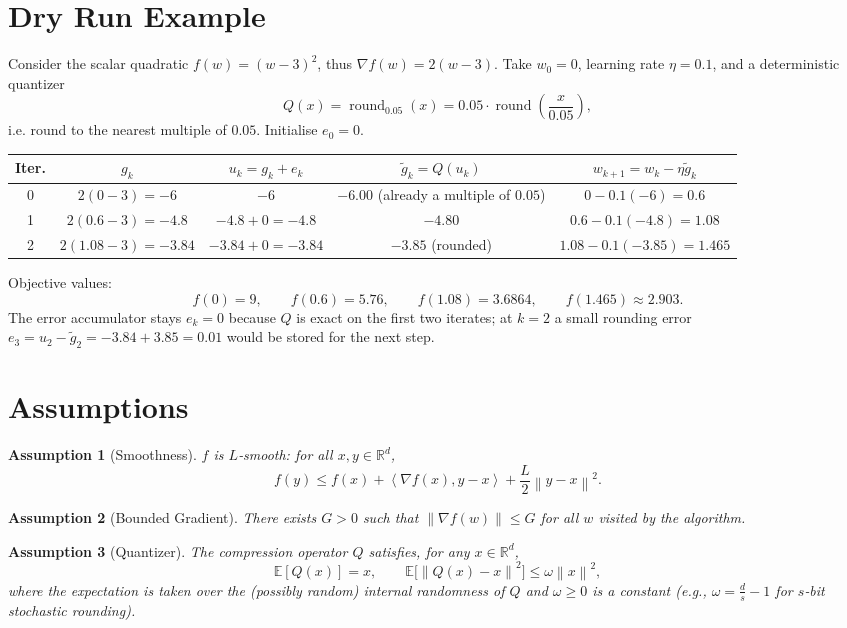 \documentclass{article}
\newtheorem{assumption}{Assumption}
\newcommand{\E}{\mathbb{E}}
\newcommand{\norm}[1]{\left\lVert #1\right\rVert}
\newcommand{\ip}[2]{\left\langle #1,#2\right\rangle}
\begin{document}
\section*{Dry Run Example}
Consider the scalar quadratic $f(w)=(w-3)^2$, thus $\nabla f(w)=2(w-3)$.  
Take $w_0=0$, learning rate $\eta=0.1$, and a deterministic quantizer 
\[
Q(x)=\operatorname{round}_{0.05}(x)=0.05\cdot\operatorname{round}\!\left(\frac{x}{0.05}\right),
\]
i.e. round to the nearest multiple of $0.05$.  Initialise $e_0=0$.

\begin{center}
\begin{tabular}{c|c|c|c|c}
\textbf{Iter.}& $g_k$ & $u_k=g_k+e_k$ & $\tilde g_k=Q(u_k)$ & $w_{k+1}=w_k-\eta\tilde g_k$ \\ \hline
0 & $2(0-3)=-6$ & $-6$ & $-6.00$ (already a multiple of $0.05$) & $0-0.1(-6)=0.6$\\
1 & $2(0.6-3)=-4.8$ & $-4.8+0= -4.8$ & $-4.80$ & $0.6-0.1(-4.8)=1.08$\\
2 & $2(1.08-3)=-3.84$ & $-3.84+0= -3.84$ & $-3.85$ (rounded) & $1.08-0.1(-3.85)=1.465$\\
\end{tabular}
\end{center}
Objective values:
\[
f(0)=9,\qquad f(0.6)=5.76,\qquad f(1.08)=3.6864,\qquad f(1.465)\approx2.903 .
\]
The error accumulator stays $e_k=0$ because $Q$ is exact on the first two iterates; at $k=2$ a small rounding error $e_3= u_2-\tilde g_2= -3.84+3.85=0.01$ would be stored for the next step.

\newpage
\section*{Assumptions}
\begin{assumption}[Smoothness]\label{ass:smooth}
$f$ is $L$‑smooth: for all $x,y\in\mathbb{R}^d$,
\[
f(y)\le f(x)+\ip{\nabla f(x)}{y-x}+\frac{L}{2}\norm{y-x}^2 .
\]
\end{assumption}

\begin{assumption}[Bounded Gradient]\label{ass:gradbound}
There exists $G>0$ such that $\norm{\nabla f(w)}\le G$ for all $w$ visited by the algorithm.
\end{assumption}

\begin{assumption}[Quantizer]\label{ass:quantizer}
The compression operator $Q$ satisfies, for any $x\in\mathbb{R}^d$,
\[
\E[Q(x)]=x,\qquad \E\!\bigl[\norm{Q(x)-x}^2\bigr]\le \omega \norm{x}^2,
\tag{A3}
\]
where the expectation is taken over the (possibly random) internal randomness of $Q$ and
$\omega\ge0$ is a constant (e.g., $\omega=\frac{d}{s}-1$ for $s$‑bit stochastic rounding).
\end{assumption}
\end{document}
